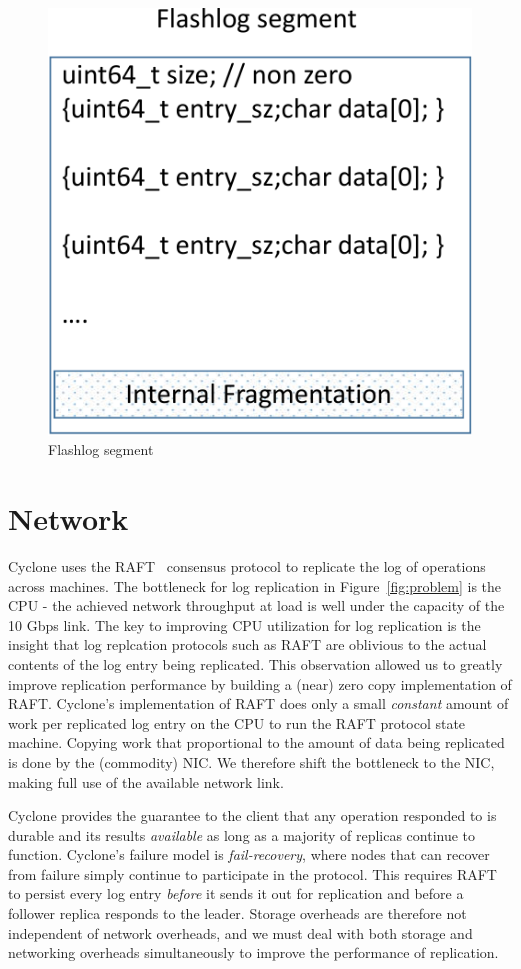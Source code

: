 \documentclass[letterpaper,twocolumn,10pt]{article}
\begin{document}
\begin{figure}
  \centering
  \includegraphics[scale=0.4]{figures2/flashlog_page.pdf}
  \caption{Flashlog segment}
  \label{fig:flashlog_page}
\end{figure}

\section{Network}
\label{sec:network}
Cyclone uses the RAFT~\cite{raft} consensus protocol to replicate the
log of operations across machines. The bottleneck for log replication
in Figure~\ref{fig:problem} is the CPU - the achieved network
throughput at load is well under the capacity of the 10 Gbps link. The
key to improving CPU utilization for log replication is the insight
that log replcation protocols such as RAFT are oblivious to the actual
contents of the log entry being replicated.  This observation allowed
us to greatly improve replication performance by building a (near)
zero copy implementation of RAFT. Cyclone's implementation of RAFT
does only a small \emph{constant} amount of work per replicated log
entry on the CPU to run the RAFT protocol state machine.  Copying work
that proportional to the amount of data being replicated is done by
the (commodity) NIC.  We therefore shift the bottleneck to the NIC,
making full use of the available network link.

Cyclone provides the guarantee to the client that any
operation responded to is durable and its results \emph{available} as long as a
majority of replicas continue to function. Cyclone's failure model is
\emph{fail-recovery}, where nodes that can recover from failure simply continue
to participate in the protocol. This requires RAFT to persist every log entry
\emph{before} it sends it out for replication and before a follower replica
responds to the leader. Storage overheads are therefore not independent of
network overheads, and we must deal with both storage and networking overheads
simultaneously to improve the performance of replication.
\end{document}
